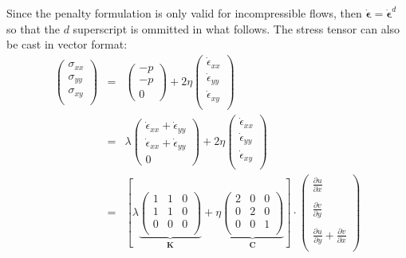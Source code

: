 Since the penalty formulation is only valid for incompressible flows, then 
$\dot{\bm \epsilon}=\dot{\bm \epsilon}^d$ so that the $d$ superscript is ommitted in what follows.
The stress tensor can also be cast in vector format:
\begin{eqnarray}
\left(
\begin{array}{c}
\sigma_{xx}\\
\sigma_{yy}\\
\sigma_{xy}\\
\end{array}
\right)
&=&
\left(
\begin{array}{c}
-p \\
-p\\
0
\end{array}
\right)
+2 \eta
\left(
\begin{array}{c}
\dot{\epsilon}_{xx}\\
\dot{\epsilon}_{yy}\\
\dot{\epsilon}_{xy}\\
\end{array}
\right)
\nonumber\\
&=&
\lambda
\left(
\begin{array}{c}
\dot{\epsilon}_{xx} + \dot{\epsilon}_{yy}\\
\dot{\epsilon}_{xx} + \dot{\epsilon}_{yy}\\
0
\end{array}
\right)
+2 \eta
\left(
\begin{array}{c}
\dot{\epsilon}_{xx}\\
\dot{\epsilon}_{yy}\\
\dot{\epsilon}_{xy}\\
\end{array}
\right)\nonumber\\
&=&
\left[
\lambda
\underbrace{
\left(
\begin{array}{ccc}
1 & 1 & 0\\
1 & 1 & 0\\
0 & 0 & 0\\
\end{array}
\right)}_{\bm K}
+ \eta
\underbrace{
\left(
\begin{array}{ccc}
2 & 0 & 0 \\
0 & 2 & 0 \\
0 & 0 & 1 \\
\end{array}
\right)
}_{\bm C}
\right]
\cdot
\left(
\begin{array}{c}
\frac{\partial u}{\partial x} \\ \\
\frac{\partial v}{\partial y} \\ \\
\frac{\partial u}{\partial y} + \frac{\partial v}{\partial x} \\
\end{array}
\right) \nonumber
\end{eqnarray}


